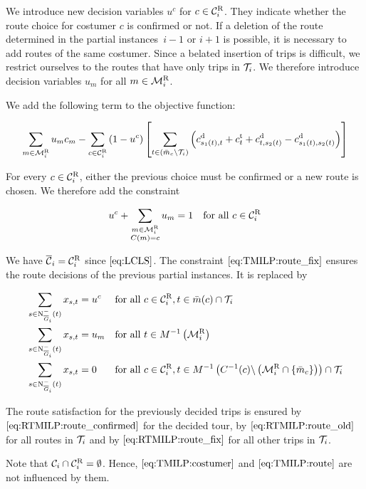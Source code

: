 We introduce new decision variables $u^c$ for $c\in\mathcal{C}^{\operatorname{R}}_i$. They indicate whether the route choice for costumer $c$ is confirmed or not. If a deletion of the route determined in the partial instances~$i-1$ or $i+1$ is possible, it is necessary to add routes of the same costumer. Since a belated insertion of trips is difficult, we restrict ourselves to the routes that have only trips in $\mathcal{T}_i$. We therefore introduce decision variables $u_m$ for all $m\in\mathcal{M}^{\operatorname{R}}_i$.

We add the following term to the objective function:

\begin{align*}
	\sum_{m\in\mathcal{M}^{\operatorname{R}}_i} u_m c_m - \sum_{c\in\mathcal{C}^{\operatorname{R}}_i} \left(1-u^c\right)\left[\sum_{t\in\left(\bar{m}_c\backslash\mathcal{T}_i\right)} \left(c^{\operatorname{d}}_{s_1(t),t}+c^{\operatorname{t}}_t+c^{\operatorname{d}}_{t,s_2(t)}-c^{\operatorname{d}}_{s_1(t),s_2(t)}\right)\right]
\end{align*}

For every $c\in\mathcal{C}^{\operatorname{R}}_i$, either the previous choice must be confirmed or a new route is chosen. We therefore add the constraint

\begin{align}
	u^c + \sum_{\substack{m\in\mathcal{M}^{\operatorname{R}}_i \\ C(m)=c}} u_m = 1 && \text{for all } c\in\mathcal{C}^{\operatorname{R}}_i \label{eq:RTMILP:costumer_old}
\end{align}

We have $\overline{\mathcal{C}}_i = \mathcal{C}^{\operatorname{R}}_i$ since $\eqref{eq:LCLS}$. The constraint $\eqref{eq:TMILP:route_fix}$ ensures the route decisions of the previous partial instances. It is replaced by

\begin{align}
	& \sum_{s\in\operatorname{N}_{\overline{G}_i}^-(t)} x_{s,t} = u^c && \text{for all } c\in\mathcal{C}^{\operatorname{R}}_i, t\in\bar{m}(c)\cap\mathcal{T}_i \label{eq:RTMILP:route_confirmed} \\
	& \sum_{s\in\operatorname{N}_{\overline{G}_i}^-(t)} x_{s,t} = u_m && \text{for all } t\in M^{-1}\left(\mathcal{M}^{\operatorname{R}}_i\right) \label{eq:RTMILP:route_old} \\
	& \sum_{s\in\operatorname{N}_{\overline{G}_i}^-(t)} x_{s,t} = 0 && \text{for all } c\in\mathcal{C}^{\operatorname{R}}_i, t\in M^{-1}\left(C^{-1}(c)\backslash\left(\mathcal{M}^{\operatorname{R}}_i\cap\left\{\bar{m}_c\right\}\right)\right)\cap\mathcal{T}_i \label{eq:RTMILP:route_fix}
\end{align}

The route satisfaction for the previously decided trips is ensured by $\eqref{eq:RTMILP:route_confirmed}$ for the decided tour, by $\eqref{eq:RTMILP:route_old}$ for all routes in $\mathcal{T}_i$ and by $\eqref{eq:RTMILP:route_fix}$ for all other trips in $\mathcal{T}_i$.

Note that $\mathcal{C}_i\cap\mathcal{C}^{\operatorname{R}}_i = \emptyset$. Hence, $\eqref{eq:TMILP:costumer}$ and $\eqref{eq:TMILP:route}$ are not influenced by them.


